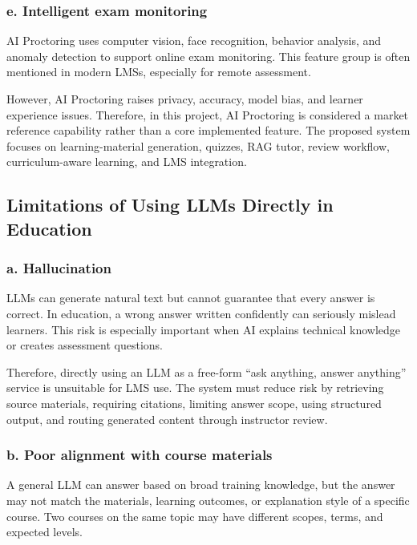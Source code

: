 \subsubsection*{e. Intelligent exam monitoring}

AI Proctoring uses computer vision, face recognition, behavior analysis, and
anomaly detection to support online exam monitoring. This feature group is
often mentioned in modern LMSs, especially for remote assessment.

However, AI Proctoring raises privacy, accuracy, model bias, and learner
experience issues. Therefore, in this project, AI Proctoring is considered a
market reference capability rather than a core implemented feature. The
proposed system focuses on learning-material generation, quizzes, RAG tutor,
review workflow, curriculum-aware learning, and LMS integration.

\subsection{Limitations of Using LLMs Directly in Education}

\subsubsection*{a. Hallucination}

LLMs can generate natural text but cannot guarantee that every answer is
correct. In education, a wrong answer written confidently can seriously mislead
learners. This risk is especially important when AI explains technical
knowledge or creates assessment questions.

Therefore, directly using an LLM as a free-form ``ask anything, answer
anything'' service is unsuitable for LMS use. The system must reduce risk by
retrieving source materials, requiring citations, limiting answer scope, using
structured output, and routing generated content through instructor review.

\subsubsection*{b. Poor alignment with course materials}

A general LLM can answer based on broad training knowledge, but the answer may
not match the materials, learning outcomes, or explanation style of a specific
course. Two courses on the same topic may have different scopes, terms, and
expected levels.

